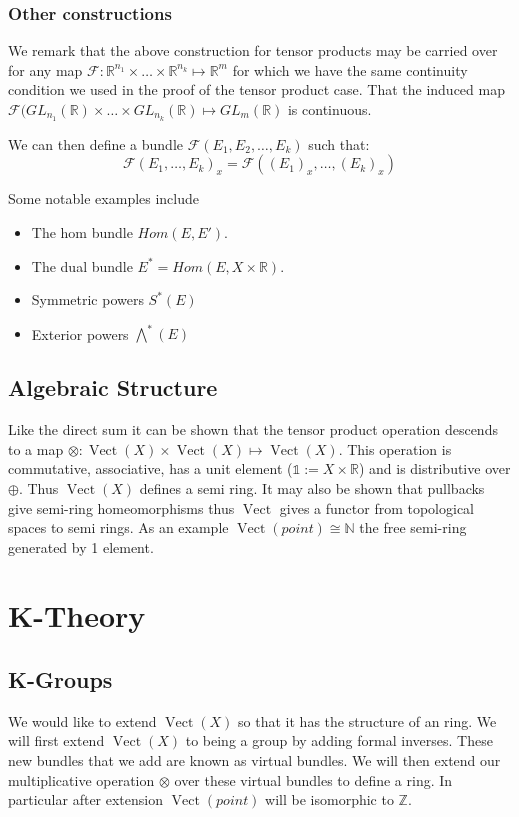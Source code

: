 \documentclass[a4paper,10pt]{article}
\theoremstyle{plain}%
\theoremstyle{definition}
\theoremstyle{remark}
\newcommand{\NN}{\mathbb{N}}
\newcommand{\ZZ}{\mathbb{Z}}
\newcommand{\RR}{\mathbb{R}}
\DeclareMathOperator{\Vect}{Vect}
\begin{document}
\subsubsection{Other constructions}

We remark that the above construction for tensor products may be carried over for any map $\mathcal{F}:\RR^{n_1}\times\ldots\times\RR^{n_k}\mapsto\RR^m$
for which we have the same continuity condition we used in the proof of the tensor product case.
That the induced map $\mathcal{F}(GL_{n_1}(\RR)\times\ldots\times GL_{n_k}(\RR)\mapsto GL_m(\RR)$ is continuous.


We can then define a bundle $\mathcal{F}(E_1,E_2,\ldots,E_k)$ such that:
$$\mathcal{F}(E_1,\ldots,E_k)_x = \mathcal{F}((E_1)_x,\ldots,(E_k)_x)$$

Some notable examples include
\begin{itemize}
 \item The hom bundle $Hom(E,E')$.
 \item The dual bundle $E^\ast = Hom(E,X\times\RR)$.
 \item Symmetric powers $S^\ast(E)$
 \item Exterior powers $\bigwedge^\ast(E)$
\end{itemize}

\subsection{Algebraic Structure}

Like the direct sum it can be shown that the tensor product operation descends to a map 
$\otimes:\Vect(X)\times \Vect(X)\mapsto \Vect(X)$. This operation is commutative, associative, has a unit element
($\mathbb{1}:=X\times\RR$) and is distributive over $\oplus$. Thus $\Vect(X)$ defines a semi ring. It may also be shown that
pullbacks give semi-ring homeomorphisms thus $\Vect$ gives a functor from topological spaces to semi rings. As an example $\Vect(point)\cong\NN$ the free semi-ring generated by 1 element.


\section{K-Theory}

\subsection{K-Groups}

We would like to extend $\Vect(X)$ so that it has the structure of an ring. We will first extend $\Vect(X)$ to being a
group by adding formal inverses. These new bundles that we add are known as virtual bundles. We will then extend our multiplicative operation $\otimes$ over these virtual bundles to define a ring. In particular after extension $\Vect(point)$ will be 
isomorphic to $\ZZ$.
\end{document}
